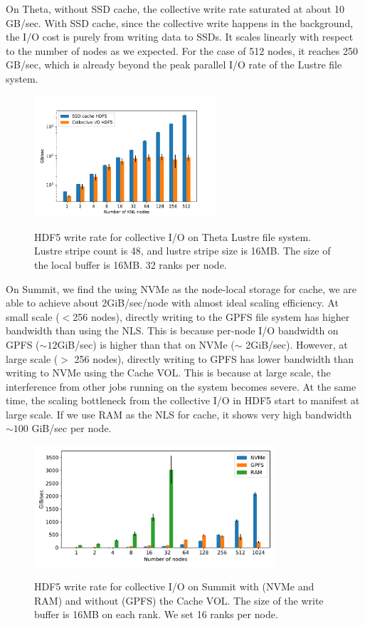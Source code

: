 \documentclass[aps, rmp, 11pt, notitlepage]{revtex4-1}
\begin{document}
On Theta, without SSD cache, the collective write rate saturated at about 10 GB/sec. With SSD cache, since the collective write happens in the background, the I/O cost is purely from writing data to SSDs. It scales linearly with respect to the number of nodes as we expected. For the case of 512 nodes, it reaches 250 GB/sec, which is already beyond the peak parallel I/O rate of the Lustre file system. 
\begin{figure}[hbt]
\centering
\includegraphics[width=0.6\textwidth]{ssd_cache.pdf}\label{sec:theta_perf}
\caption{HDF5 write rate for collective I/O on Theta Lustre file system. Lustre stripe count is 48, and lustre stripe size is 16MB. The size of the local buffer is 16MB. 32 ranks per node.}\label{fig:perf}
\end{figure}

On Summit, we find the using NVMe as the node-local storage for cache, we are able to achieve about 2GiB/sec/node with almost ideal scaling efficiency. At small scale ($<$256 nodes), directly writing to the GPFS file system has higher bandwidth than using the NLS. This is because per-node I/O bandwidth on GPFS ($\sim 12$GiB/sec) is higher than that on NVMe ($\sim$ 2GiB/sec). However, at large scale ($>$ 256 nodes), directly writing to GPFS has lower bandwidth than writing to NVMe using the Cache VOL. This is because at large scale, the interference from other jobs running on the system becomes severe. At the same time, the scaling bottleneck from the collective I/O in HDF5 start to manifest at large scale. If we use RAM as the NLS for cache, it shows very high bandwidth $\sim 100$ GiB/sec per node. 
\begin{figure}[hbt]
\centering
\includegraphics[width=0.8\textwidth]{summit_cache_vol.pdf}\label{sec:summit_perf}
\caption{HDF5 write rate for collective I/O on Summit with (NVMe and RAM) and without (GPFS) the Cache VOL. The size of the write buffer is 16MB on each rank. We set 16 ranks per node.}\label{fig:perf}
\end{figure}
\end{document}
